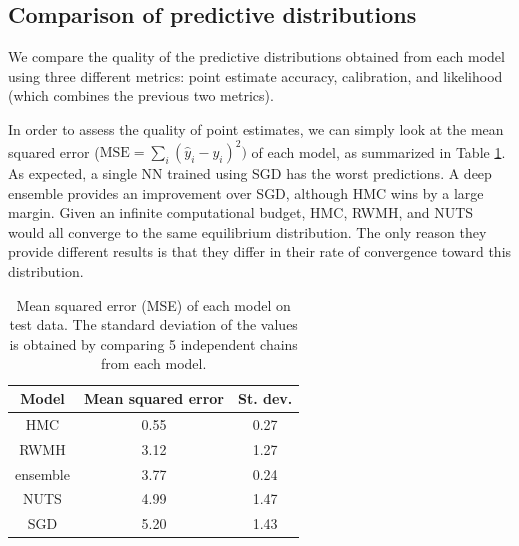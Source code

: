 \documentclass[12pt]{article}
\begin{document}
\subsection{Comparison of predictive distributions}

We compare the quality of the predictive distributions obtained from each model using three different metrics: point estimate accuracy, calibration, and likelihood (which combines the previous two metrics).

In order to assess the quality of point estimates, we can simply look at the mean squared error ($\text{MSE} = \sum_i (\hat{y}_i - y_i)^2)$ of each model, as summarized in Table \ref{table_uci_mse}. As expected, a single NN trained using SGD has the worst predictions. A deep ensemble provides an improvement over SGD, although HMC wins by a large margin. Given an infinite computational budget, HMC, RWMH, and NUTS would all converge to the same equilibrium distribution. The only reason they provide different results is that they differ in their rate of convergence toward this distribution.
 
\begin{table}[H]
\centering
\begin{tabular}{|c|c|c|}
\hline
Model    & Mean squared error & St. dev. \\ \hline
HMC      & 0.55               & 0.27     \\ \hline
RWMH     & 3.12               & 1.27     \\ \hline
ensemble & 3.77               & 0.24     \\ \hline
NUTS     & 4.99               & 1.47     \\ \hline
SGD      & 5.20               & 1.43     \\ \hline
\end{tabular}
\caption{Mean squared error (MSE) of each model on test data. The standard deviation of the values is obtained by comparing 5 independent chains from each model.}
\label{table_uci_mse}
\end{table}
\end{document}
